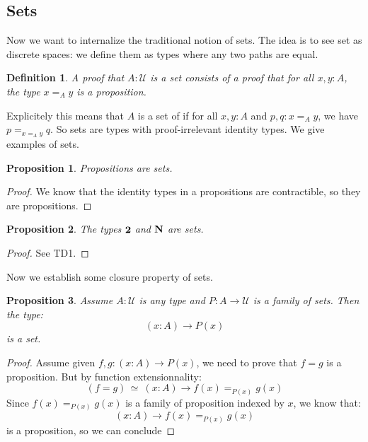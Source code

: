 \documentclass{article}
\newcommand{\sse}[1]{\medbreak \subsection{#1}}
\newcommand{\U}{{\mathcal U}}
\renewcommand{\r}{\rightarrow}
\newcommand{\N}{\mathrm{\bf N}}
\newcommand{\two}{{\bf 2}}
\newtheorem{definition}{Definition}
\newtheorem{proposition}{Proposition}
\begin{document}





\sse{Sets}

Now we want to internalize the traditional notion of sets. The idea is to see set as discrete spaces: we define them as types where any two paths are equal.

\begin{definition}
A proof that $A:\U$ is a set consists of a proof that for all $x,y:A$, the type $x=_A y$ is a proposition.
\end{definition}

Explicitely this means that $A$ is a set of if for all $x,y:A$ and $p,q:x=_Ay$, we have $p=_{x=_Ay} q$. So sets are types with proof-irrelevant identity types. We give examples of sets.

\begin{proposition}
Propositions are sets.
\end{proposition}
\begin{proof}
We know that the identity types in a propositions are contractible, so they are propositions.
\end{proof}

\begin{proposition}
The types $\two$ and $\N$ are sets.
\end{proposition}
\begin{proof}
See TD1.
\end{proof}

Now we establish some closure property of sets.

\begin{proposition}
Assume $A:\U$ is any type and $P:A\r \U$ is a family of sets. Then the type:
\[(x:A)\r P(x)\]
is a set.
\end{proposition}
\begin{proof}
Assume given $f,g:(x:A)\r P(x)$, we need to prove that $f=g$ is a proposition. But by function extensionnality:
\[(f=g)\, \simeq \ (x:A)\r f(x)=_{P(x)}g(x)\]
Since $f(x)=_{P(x)}g(x)$ is a family of proposition indexed by $x$, we know that:
\[(x:A)\r f(x)=_{P(x)}g(x)\]
is a proposition, so we can conclude
\end{proof}
\end{document}
